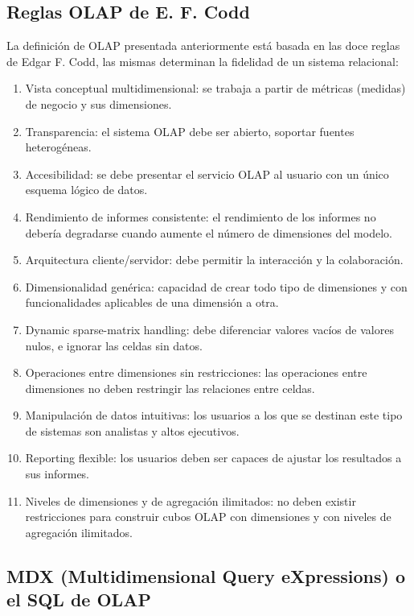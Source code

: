 \documentclass[DIV=calc, paper=a4, fontsize=11pt, twocolumn]{scrartcl}	 %
\begin{document}
\subsection*{Reglas OLAP de E. F. Codd}
La definición de OLAP presentada anteriormente est\'{a} basada en las doce reglas de Edgar F. Codd, las mismas determinan la fidelidad de un sistema relacional:
\begin{enumerate}
\item Vista conceptual multidimensional: se trabaja a partir de m\'{e}tricas (medidas) de negocio y sus dimensiones.
\item Transparencia: el sistema OLAP debe ser abierto, soportar fuentes heterog\'{e}neas.
\item Accesibilidad: se debe presentar el servicio OLAP al usuario con un \'{u}nico esquema l\'{o}gico de datos.
\item Rendimiento de informes consistente: el rendimiento de los informes no deber\'{i}a degradarse cuando aumente el n\'{u}mero de dimensiones del modelo.
\item Arquitectura cliente/servidor: debe permitir la interacci\'{o}n y la colaboraci\'{o}n.
\item Dimensionalidad gen\'{e}rica: capacidad de crear todo tipo de dimensiones y con funcionalidades aplicables de una dimensi\'{o}n a otra.
\item Dynamic sparse-matrix handling: debe diferenciar valores vac\'{i}os de valores nulos, e ignorar las celdas sin datos.
\item Operaciones entre dimensiones sin restricciones: las operaciones entre dimensiones no deben restringir las relaciones entre celdas.
\item Manipulaci\'{o}n de datos intuitivas: los usuarios a los que se destinan este tipo de sistemas son analistas y altos ejecutivos.
\item Reporting flexible: los usuarios deben ser capaces de ajustar los resultados a sus informes.
\item Niveles de dimensiones y de agregación ilimitados: no deben existir restricciones para construir cubos OLAP con dimensiones y con niveles de agregaci\'{o}n ilimitados.
\end{enumerate}

\subsection*{MDX (Multidimensional Query eXpressions) o el SQL de OLAP}
\end{document}
